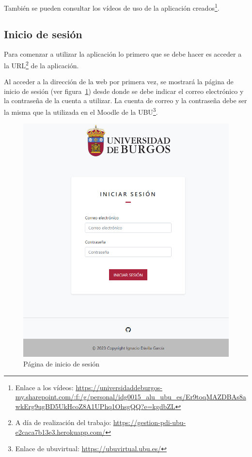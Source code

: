 También se pueden consultar los vídeos de uso de la aplicación creados\footnote{Enlace a los vídeos: \url{https://universidaddeburgos-my.sharepoint.com/:f:/g/personal/idg0015_alu_ubu_es/Er9toqMAZDBAs8awkErg9ugBD5UkHcoZ8A1UPhq1OhsgQQ?e=kgdbZL}}.

\subsection{Inicio de sesión}

Para comenzar a utilizar la aplicación lo primero que se debe hacer es acceder a la URL\footnote{A día de realización del trabajo: \url{https://gestion-pdi-ubu-e2caca7b13e3.herokuapp.com/}} de la aplicación.

Al acceder a la dirección de la web por primera vez, se mostrará la página de inicio de sesión (ver figura~\ref{pag:login}) desde donde se debe indicar el correo electrónico y la contraseña de la cuenta a utilizar.
La cuenta de correo y la contraseña debe ser la misma que la utilizada en el Moodle de la UBU\footnote{Enlace de ubuvirtual: \url{https://ubuvirtual.ubu.es/}}.

\begin{figure}
	\centering
	\includegraphics[width=\textwidth]{../img/Anexos/Manual usuario/login.png}
	\caption{Página de inicio de sesión}\label{pag:login}
\end{figure}

